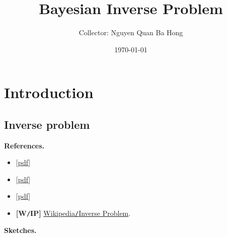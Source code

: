 \documentclass[oneside]{article}
\title{Bayesian Inverse Problem}
\author{Collector: Nguyen Quan Ba Hong}
\date{\today}
\numberwithin{equation}{section}
\begin{document}
\maketitle
\setcounter{secnumdepth}{6}
\setcounter{tocdepth}{6}
\tableofcontents


\section{Introduction}

\subsection{Inverse problem}
\textbf{References.}
\begin{itemize}
    \item \cite{Aster_Borchers_Thurber2018} [\href{https://github.com/NQBH/reference/blob/master/Aster_Borchers_Thurber2018.pdf}{pdf}]
    \item \cite{Ito_Jin2015} [\href{https://github.com/NQBH/reference/blob/master/Ito_Jin2015.pdf}{pdf}]
    \item \cite{Kirsch2021} [\href{https://github.com/NQBH/reference/blob/master/Kirsch2021.pdf}{pdf}]
    \item \textbf{[W\texttt{/}IP]} \href{https://en.wikipedia.org/wiki/Inverse_problem}{Wikipedia\texttt{/}Inverse Problem}.
\end{itemize}
\textbf{Sketches.}
\end{document}
